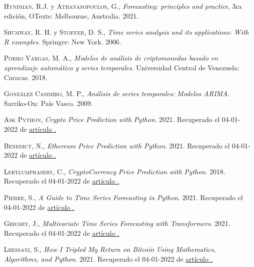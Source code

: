 \documentclass[a4paper,10pt]{article}
\begin{document}
\begin{thebibliography}{X}

 \textsc{Hyndman, R.J.} y \textsc{Athanasopoulos, G.},
\textit{Forecasting: principles and practice}, 3ra edición, OTexts: Melbourne, Australia. 2021.

 \textsc{Shumway, R. H.} y \textsc{Stoffer, D. S.}, \textit{Time series analysis and its applications: With R examples}. Springer: New York. 2006.

 \textsc{Porro Vargas, M. A.}, \textit{Modelos de análisis de criptomonedas basado en aprendizaje automático y series temporales}. Universidad Central de Venezuela: Caracas. 2018.

 \textsc{González Casimiro, M. P.}, \textit{Análisis de series temporales: Modelos ARIMA}. Sarriko-On: País Vasco. 2009.

 \textsc{Ask Python}, \textit{Crypto Price Prediction with Python}. 2021. Recuperado el 04-01-2022 de \href{https://www.askpython.com/python/examples/crypto-price-prediction}{artículo \faExternalLink.}

 \textsc{Benedict, N.}, \textit{Ethereum Price Prediction with Python}. 2021. Recuperado el 04-01-2022 de \href{https://medium.com/bitgrit-data-science-publication/ethereum-price-prediction-with-python-3b3805e6e512}{artículo \faExternalLink.}

 \textsc{Lertlumprasert, C.}, \textit{CryptoCurrency Price Prediction with Python}. 2018. Recuperado el 04-01-2022 de \href{https://towardsdatascience.com/demystifying-cryptocurrency-price-prediction-5fb2b504a110}{artículo \faExternalLink.}

 \textsc{Pierre, S.}, \textit{A Guide to Time Series Forecasting in Python}. 2021. Recuperado el 04-01-2022 de \href{https://builtin.com/data-science/time-series-forecasting-python}{artículo \faExternalLink.}

 \textsc{Grigsby, J.}, \textit{Multivariate Time Series Forecasting with Transformers}. 2021. Recuperado el 04-01-2022 de \href{https://towardsdatascience.com/multivariate-time-series-forecasting-with-transformers-384dc6ce989b}{artículo \faExternalLink.}

 \textsc{Lhessani, S.}, \textit{How I Tripled My Return on Bitcoin Using Mathematics, Algorithms, and Python}. 2021. Recuperado el 04-01-2022 de \href{https://levelup.gitconnected.com/how-i-tripled-my-return-on-bitcoin-using-mathematics-algorithms-and-python-347edd9b5625}{artículo \faExternalLink.}


\end{thebibliography}
\end{document}

